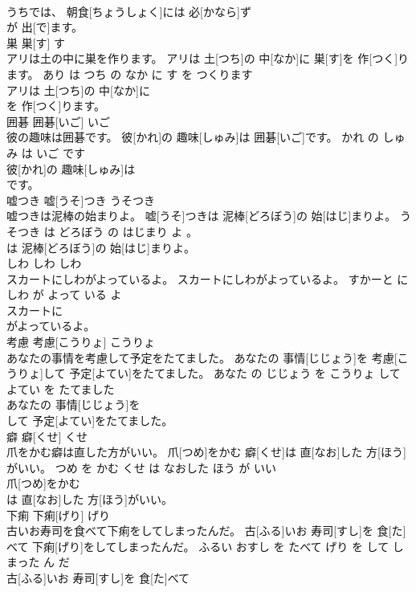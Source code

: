 \documentclass[8pt]{extreport}
\begin{document}
\begin{CJK}{UTF8}{min}
\\	うちでは、 朝食[ちょうしょく]には 必[かなら]ず
\\	が 出[で]ます。			
\\	巣	巣[す]	す	
\\	アリは土の中に巣を作ります。	アリは 土[つち]の 中[なか]に 巣[す]を 作[つく]ります。	あり は つち の なか に す を つくります	
\\	アリは 土[つち]の 中[なか]に
\\	を 作[つく]ります。			
\\	囲碁	囲碁[いご]	いご	
\\	彼の趣味は囲碁です。	彼[かれ]の 趣味[しゅみ]は 囲碁[いご]です。	かれ の しゅみ は いご です	
\\	彼[かれ]の 趣味[しゅみ]は
\\	です。			
\\	嘘つき	嘘[うそ]つき	うそつき	
\\	嘘つきは泥棒の始まりよ。	嘘[うそ]つきは 泥棒[どろぼう]の 始[はじ]まりよ。	うそつき は どろぼう の はじまり よ 。	
\\	は 泥棒[どろぼう]の 始[はじ]まりよ。			
\\	しわ	しわ	しわ	
\\	スカートにしわがよっているよ。	スカートにしわがよっているよ。	すかーと に しわ が よって いる よ	
\\	スカートに
\\	がよっているよ。			
\\	考慮	考慮[こうりょ]	こうりょ	
\\	あなたの事情を考慮して予定をたてました。	あなたの 事情[じじょう]を 考慮[こうりょ]して 予定[よてい]をたてました。	あなた の じじょう を こうりょ して よてい を たてました	
\\	あなたの 事情[じじょう]を
\\	して 予定[よてい]をたてました。			
\\	癖	癖[くせ]	くせ	
\\	爪をかむ癖は直した方がいい。	爪[つめ]をかむ 癖[くせ]は 直[なお]した 方[ほう]がいい。	つめ を かむ くせ は なおした ほう が いい	
\\	爪[つめ]をかむ
\\	は 直[なお]した 方[ほう]がいい。			
\\	下痢	下痢[げり]	げり	
\\	古いお寿司を食べて下痢をしてしまったんだ。	古[ふる]いお 寿司[すし]を 食[た]べて 下痢[げり]をしてしまったんだ。	ふるい おすし を たべて げり を して しまった ん だ	
\\	古[ふる]いお 寿司[すし]を 食[た]べて

\end{CJK}
\end{document}
